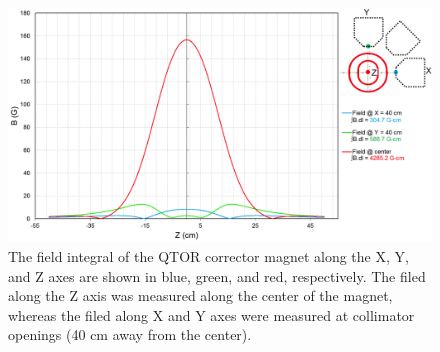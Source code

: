 \begin{figure}[!h]
	\begin{center}
		\includegraphics[width=15.0cm]{figures/qtor_corrector_field_integral}
		\caption
		{The field integral of the QTOR corrector magnet along the X, Y, and Z axes are shown in blue, green, and red, respectively. The filed along the Z axis was measured along the center of the magnet, whereas the filed along X and Y axes were measured at collimator openings (40 cm away from the center).}
		\label{fig:qtor_corrector_field_integral}
	\end{center}
\end{figure}



%

